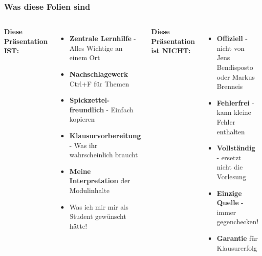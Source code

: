 \begin{frame}
  \thispagestyle{empty}
  \frametitle{Was diese Folien sind}
  \begin{columns}[T]
    \textbf{Diese Präsentation IST:}
    \begin{itemize}
      \item \textbf{Zentrale Lernhilfe} - Alles Wichtige an einem Ort
      \item \textbf{Nachschlagewerk} - Ctrl+F für Themen
      \item \textbf{Spickzettel-freundlich} - Einfach kopieren
      \item \textbf{Klausurvorbereitung} - Was ihr wahrscheinlich braucht
      \item \textbf{Meine Interpretation} der Modulinhalte
      \item Was ich mir mir als Student gewünscht hätte!
    \end{itemize}

    \textbf{Diese Präsentation ist NICHT:}
    \begin{itemize}
      \item \textbf{Offiziell} - nicht von Jens Bendisposto oder Markus Brenneis
      \item \textbf{Fehlerfrei} - kann kleine Fehler enthalten
      \item \textbf{Vollständig} - ersetzt nicht die Vorlesung
      \item \textbf{Einzige Quelle} - immer gegenchecken!
      \item \textbf{Garantie} für Klausurerfolg
    \end{itemize}
  \end{columns}
\end{frame}

